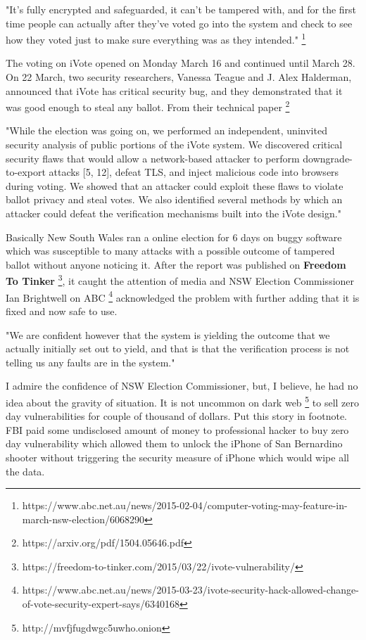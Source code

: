  "It's fully encrypted and safeguarded, it can't be tampered with, 
 and for the first time people can actually after they've voted 
 go into the system and check to see how they voted just to make 
 sure everything was as they intended." 
 \footnote{https://www.abc.net.au/news/2015-02-04/computer-voting-may-feature-in-march-nsw-election/6068290} 

  The voting on iVote 
  opened on Monday March 16 and continued until March 28. On 22 March,
  two security researchers, Vanessa Teague and J. Alex Halderman, 
  announced that iVote has critical security bug, and they demonstrated 
  that it was good enough to steal any ballot. From their technical paper
  \footnote{https://arxiv.org/pdf/1504.05646.pdf}
  
  
  "While the election was going on, we performed an independent,
   uninvited security analysis of public portions of the iVote 
   system. We discovered critical security flaws that would allow
   a network-based attacker to perform downgrade-to-export 
   attacks [5, 12], defeat TLS, and inject malicious code 
   into browsers during voting. We showed that an attacker could
   exploit these flaws to violate ballot privacy and steal votes. 
   We also identified several methods by which an attacker could
   defeat the verification mechanisms built into the iVote design."  
  
    
  Basically New South Wales ran a online election for 6 days on 
  buggy software which was susceptible to many attacks with a possible 
  outcome of tampered ballot without anyone noticing it. After the 
  report was published on \textbf{Freedom To Tinker}
  \footnote{https://freedom-to-tinker.com/2015/03/22/ivote-vulnerability/}, 
  it caught the attention of media and NSW Election Commissioner 
  Ian Brightwell on ABC
	\footnote{https://www.abc.net.au/news/2015-03-23/ivote-security-hack-allowed-change-of-vote-security-expert-says/6340168}  
   acknowledged the problem with further adding 
  that it is fixed and now safe to use.
  
  "We are confident however that the system is yielding the outcome that
   we actually initially set out to yield, and that is that the
   verification process is not telling us any faults are in the system." 
   
   I admire the confidence of NSW Election Commissioner, but, I believe, 
   he had no idea about the gravity of situation. It is not uncommon 
   on dark web \footnote{http://mvfjfugdwgc5uwho.onion} to sell zero 
   day vulnerabilities for couple of thousand of dollars.  
   Put this story in footnote. FBI paid 
   some undisclosed amount of money to professional hacker to buy zero 
   day vulnerability which allowed them to 
   unlock the iPhone of San Bernardino  shooter without triggering 
   the security measure of iPhone which would wipe all the data. 
   
